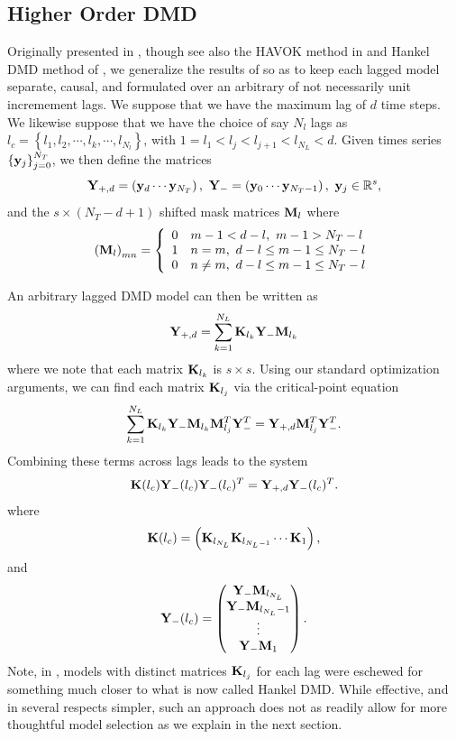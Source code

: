 \documentclass[a4paper,11pt]{article}
\newcommand{\ba}{\begin{array}}
\newcommand{\ea}{\end{array}}
\begin{document}
\subsection{Higher Order DMD}

Originally presented in \cite{clainche}, though see also the HAVOK method in \cite{brunton_havok} and Hankel DMD method of \cite{arbabi}, we generalize the results of \cite{clainche} so as to keep each lagged model separate, causal, and formulated over an arbitrary of not necessarily unit incremement lags.  We suppose that we have the maximum lag of $d$ time steps.  We likewise suppose that we have the choice of say $N_{l}$ lags as $l_{c}=\left\{l_{1}, l_{2}, \cdots, l_{k}, \cdots, l_{N_{l}}\right\}$, with $1=l_{1} < l_{j} < l_{j+1} < l_{N_{L}}<d$.  Given times series $\left\{{\bf y}_{j}\right\}_{j=0}^{N_{T}}$, we then define the matrices 
\[
{\bf Y}_{+,d} = \left({\bf y}_{d} \cdots {\bf y}_{N_{T}}\right), ~ {\bf Y}_{-} = \left({\bf y}_{0} \cdots {\bf y}_{N_{T}-1}\right), ~ {\bf y}_{j}\in\mathbb{R}^{s},
\]  
and the $s\times (N_{T}-d+1)$ shifted mask matrices ${\bf M}_{l}$ where
\[
\left({\bf M}_{l}\right)_{mn} = \left\{
\ba{rl}
0 & m-1 < d-l, ~ m-1 > N_{T} - l\\
1 & n=m, ~ d-l\leq m-1 \leq N_{T} - l\\
0 & n\neq m, ~ d-l\leq m-1 \leq N_{T} - l
\ea
\right.
\]

An arbitrary lagged DMD model can then be written as 
\[
{\bf Y}_{+,d} = \sum_{k=1}^{N_{L}}{\bf K}_{l_{k}}{\bf Y}_{-}{\bf M}_{l_{k}}
\]
where we note that each matrix ${\bf K}_{l_{k}}$ is $s\times s$.  Using our standard optimization arguments, we can find each matrix ${\bf K}_{l_{j}}$ via the critical-point equation
\[
\sum_{k=1}^{N_{L}}{\bf K}_{l_{k}}{\bf Y}_{-}{\bf M}_{l_{k}}{\bf M}_{l_{j}}^{T}{\bf Y}_{-}^{T} = {\bf Y}_{+,d}{\bf M}_{l_{j}}^{T}{\bf Y}_{-}^{T}.
\]
Combining these terms across lags leads to the system 
\[
{\bf K}(l_{c}) {\bf Y}_{-}(l_{c}){\bf Y}_{-}(l_{c})^{T} = {\bf Y}_{+, d}{\bf Y}_{-}(l_{c})^{T}.
\]
where
\[
{\bf K}(l_{c}) = \left({\bf K}_{l_{N_{L}}} {\bf K}_{l_{N_{L}-1}} \cdots {\bf K}_{1}\right), 
\]
and
\[
{\bf Y}_{-}(l_{c}) = \begin{pmatrix} {\bf Y}_{-}{\bf M}_{l_{N_{L}}} \\ {\bf Y}_{-}{\bf M}_{l_{N_{L}}-1} \\ \vdots \\ {\bf Y}_{-}{\bf M}_{1} \end{pmatrix}.
\]
Note, in \cite{clainche}, models with distinct matrices ${\bf K}_{l_{j}}$ for each lag were eschewed for something much closer to what is now called Hankel DMD.  While effective, and in several respects simpler, such an approach does not as readily allow for more thoughtful model selection as we explain in the next section.  
\end{document}
